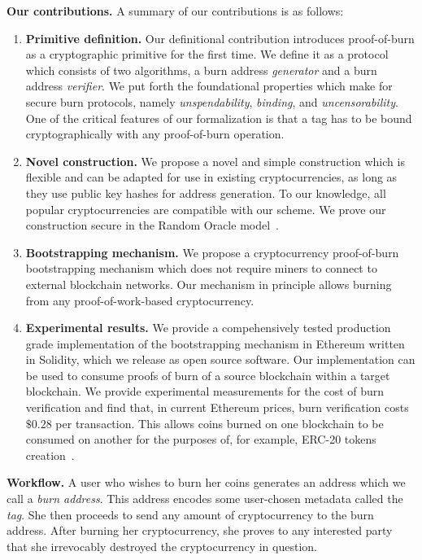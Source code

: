 \noindent
\textbf{Our contributions.}
A summary of our contributions is as follows:
\begin{enumerate}[wide, labelwidth=!, labelindent=0pt, label=(\roman*)]
    \item \textbf{Primitive definition.} Our definitional contribution introduces proof-of-burn as a cryptographic primitive for the first time. We
    define it as a protocol which consists of two algorithms, a burn address \emph{generator} and a burn address \emph{verifier}. We put forth the foundational properties which make for secure burn protocols, namely \emph{unspendability}, \emph{binding}, and \emph{uncensorability}.   One of the critical  features of our formalization is that a tag has to be bound cryptographically with any proof-of-burn operation.
    \item \textbf{Novel construction.} We propose a novel and simple construction which is flexible and can be adapted for use in existing cryptocurrencies, as long as they use public key hashes for address generation. To our knowledge, all popular cryptocurrencies are
    compatible with our scheme. We prove our construction secure in the Random Oracle model~\cite{ro}.
    \item \textbf{Bootstrapping mechanism.} We propose a cryptocurrency proof-of-burn bootstrapping mechanism which does not require miners to connect to external blockchain networks. Our mechanism in principle allows burning from any proof-of-work-based cryptocurrency.
    \item \textbf{Experimental results.} We provide a compehensively tested production grade implementation of the bootstrapping mechanism in Ethereum
    written in Solidity, which we release as open source software. Our implementation can be used to consume proofs of burn of a source blockchain
    within a target blockchain. We provide experimental measurements for the cost of burn verification and find that, in current Ethereum prices,
    burn verification costs $\$0.28$ per transaction.
    This allows coins burned on one blockchain to be consumed on another for the purposes of, for example, ERC-20 tokens creation~\cite{erc20}.
\end{enumerate}

\noindent
\textbf{Workflow.}
A user who wishes to burn her coins generates an address which we call a \emph{burn address}.
This address encodes some user-chosen metadata called the \emph{tag}. She then proceeds to send any amount of cryptocurrency to the burn address. After burning her cryptocurrency, she proves to any interested party that she irrevocably destroyed the cryptocurrency in question.

